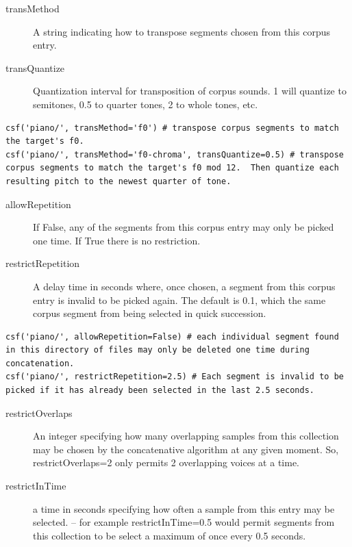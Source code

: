 \documentclass{article}
\begin{document}
\begin{spacing}{1.2}
\begin{description}
\item[transMethod] A string indicating how to transpose segments chosen from this corpus entry.

\item[transQuantize] Quantization interval for transposition of corpus sounds.  1 will quantize to semitones, 0.5 to quarter tones, 2 to whole tones, etc.

\end{description}
\begin{lstlisting}
csf('piano/', transMethod='f0') # transpose corpus segments to match the target's f0.
csf('piano/', transMethod='f0-chroma', transQuantize=0.5) # transpose corpus segments to match the target's f0 mod 12.  Then quantize each resulting pitch to the newest quarter of tone.
\end{lstlisting}
\begin{description}

\item[allowRepetition] If False, any of the segments from this corpus entry may only be picked one time.  If True there is no restriction.

\item[restrictRepetition] A delay time in seconds where, once chosen, a segment from this corpus entry is invalid to be picked again.  The default is 0.1, which the same corpus segment from being selected in quick succession.

\end{description}
\begin{lstlisting}
csf('piano/', allowRepetition=False) # each individual segment found in this directory of files may only be deleted one time during concatenation.
csf('piano/', restrictRepetition=2.5) # Each segment is invalid to be picked if it has already been selected in the last 2.5 seconds.
\end{lstlisting}
\begin{description}


\item[restrictOverlaps] An integer specifying how many overlapping samples from this collection may be chosen by the concatenative algorithm at any given moment.  So, restrictOverlaps=2 only permits 2 overlapping voices at a time.

\item[restrictInTime] a time in seconds specifying how often a sample from this entry may be selected. -- for example restrictInTime=0.5 would permit segments from this collection to be select a maximum of once every 0.5 seconds.


\end{description}
\end{spacing}
\end{document}
